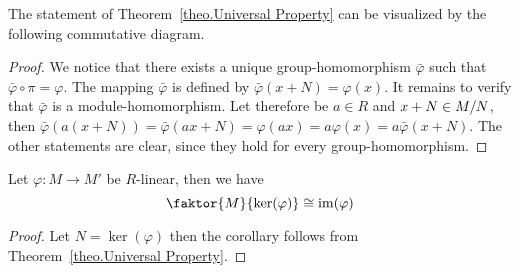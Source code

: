 The statement of Theorem~\ref{theo.Universal Property} can be visualized by the following commutative diagram.

\begin{center}
\end{center}


\begin{proof}
We notice that there exists a unique group-homomorphism $\bar{\varphi}$ such that $\bar{\varphi}\circ\pi=\varphi$. The mapping $\bar{\varphi}$ is defined by $\bar{\varphi}(x+N)=\varphi(x)$. It remains to verify that $\bar{\varphi}$ is a module-homomorphism. Let therefore be $a\in R$ and $x+N\in M/N$, then $\bar{\varphi}(a(x+N))=\bar{\varphi}(ax+N)=\varphi(ax)=a\varphi(x)=a\bar{\varphi}(x+N)$. The other statements are clear, since they hold for every group-homomorphism.
\end{proof}

\begin{cor} \label{cor.Homomorphism Theorem}
Let $\varphi\colon M\to M'$ be $R$-linear, then we have
\begin{equation*}
\faktor{M}{\ker(\varphi)}\cong\im(\varphi)
\end{equation*}
\end{cor}
\begin{proof}
Let $N=\ker(\varphi)$ then the corollary follows from Theorem~\ref{theo.Universal Property}.
\end{proof}

